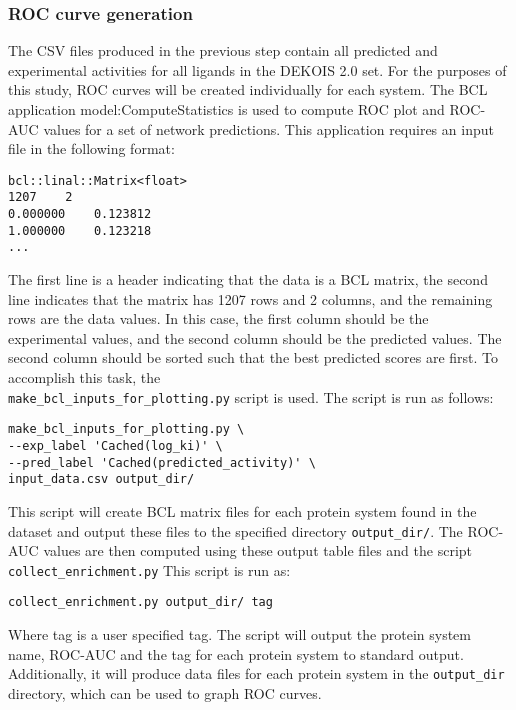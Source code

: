 \subsubsection{\acs{ROC} curve generation}
The \ac{CSV} files produced in the previous step contain all predicted and experimental activities for all ligands in the DEKOIS 2.0 set.
For the purposes of this study, \ac{ROC} curves will be created individually for each system. 
The \ac{BCL} application model:ComputeStatistics is used to compute \ac{ROC} plot and \ac{ROC-AUC} values for a set of network predictions.
This application requires an input file in the following format:
\singlespace
\begin{verbatim}
bcl::linal::Matrix<float>
1207	2
0.000000	0.123812
1.000000	0.123218
...
\end{verbatim}
\doublespace
The first line is a header indicating that the data is a \ac{BCL} matrix, the second line indicates that the matrix has 1207 rows and 2 columns, and the remaining rows are the data values.
In this case, the first column should be the experimental values, and the second column should be the predicted values.
The second column should be sorted such that the best predicted scores are first.
To accomplish this task, the\\
\texttt{make\_bcl\_inputs\_for\_plotting.py} script is used. 
The script is run as follows:
\singlespace
\begin{verbatim}
make_bcl_inputs_for_plotting.py \
--exp_label 'Cached(log_ki)' \
--pred_label 'Cached(predicted_activity)' \
input_data.csv output_dir/
\end{verbatim}
\doublespace
This script will create \ac{BCL} matrix files for each protein system found in the dataset and output these files to the specified directory \texttt{output\_dir/}.
The \ac{ROC-AUC} values are then computed using these output table files and the script \texttt{collect\_enrichment.py}
This script is run as:
\singlespace
\begin{verbatim}
collect_enrichment.py output_dir/ tag
\end{verbatim}
\doublespace
Where tag is a user specified tag.
The script will output the protein system name, \ac{ROC-AUC} and the tag for each protein system to standard output.
Additionally, it will produce data files for each protein system in the \texttt{output\_dir} directory, which can be used to graph \ac{ROC} curves. 
